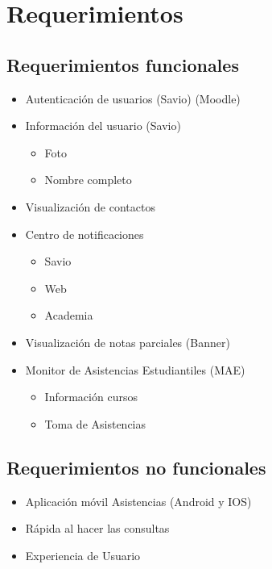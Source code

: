 \chapter{Requerimientos}

\section{Requerimientos funcionales}

\begin{itemize}
 \item Autenticación de usuarios (Savio) (Moodle)
 \item Información del usuario (Savio)
  \begin{itemize}
         \item Foto
         \item Nombre completo
    \end{itemize}
 \item Visualización de contactos
 \item Centro de notificaciones
     \begin{itemize}
         \item Savio
         \item Web
         \item Academia
    \end{itemize}
 \item Visualización de notas parciales (Banner)
 \item Monitor de Asistencias Estudiantiles (MAE)
    \begin{itemize}
         \item Información cursos
         \item Toma de Asistencias
    \end{itemize}
\end{itemize}

\section{Requerimientos no funcionales}
 \begin{itemize}
         \item Aplicación móvil Asistencias (Android y IOS)
         \item Rápida al hacer las consultas
         \item Experiencia de Usuario
\end{itemize}

